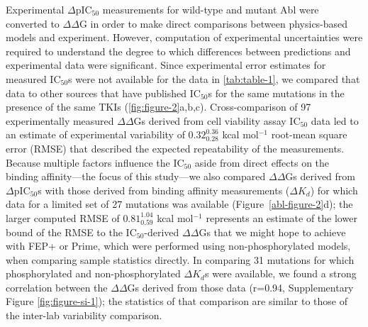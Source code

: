 \documentclass[phd,tocprelim]{cornell}
\renewcommand{\FIG}[1]{\autoref{fig:#1}}
\renewcommand{\TABLE}[1]{\autoref{tab:#1}}
\begin{document}
%

Experimental $\Delta$pIC$_{50}$ measurements for wild-type and mutant Abl were converted to $\Delta\Delta$G in order to make direct comparisons between physics-based models and experiment.
  However, computation of experimental uncertainties were required to understand the degree to which differences between predictions and experimental data were significant.
  Since experimental error estimates for measured IC$_{50}$s were not available for the data in \TABLE{table-1}, we compared that data to other sources that have published IC$_{50}$s for the same mutations in the presence of the same TKIs (\FIG{figure-2}a,b,c).
  Cross-comparison of 97 experimentally measured $\Delta\Delta$Gs derived from cell viability assay IC$_{50}$ data led to an estimate of experimental variability of $0.32^{0.36}_{0.28}$ kcal mol$^{-1}$ root-mean square error (RMSE) that described the expected repeatability of the measurements.
  Because multiple factors influence the IC$_{50}$ aside from direct effects on the binding affinity---the focus of this study---we also compared $\Delta\Delta$Gs derived from $\Delta$pIC$_{50}$s with those derived from binding affinity measurements ($\Delta K_{d}$) for which data for a limited set of 27 mutations was available (Figure~\ref{abl-figure-2}d); the larger computed RMSE of $0.81^{1.04}_{0.59}$ kcal mol$^{-1}$ represents an estimate of the lower bound of the RMSE to the IC$_{50}$-derived $\Delta\Delta$Gs that we might hope to achieve with FEP+ or Prime, which were performed using non-phosphorylated models, when comparing sample statistics directly.
In comparing 31 mutations for which phosphorylated and non-phosphorylated $\Delta K_{d}$s were available, we found a strong correlation between the $\Delta\Delta$Gs derived from those data (r=0.94, Supplementary Figure \ref{fig:figure-si-1}); the statistics of that comparison are similar to those of the inter-lab variability comparison.
\end{document}
